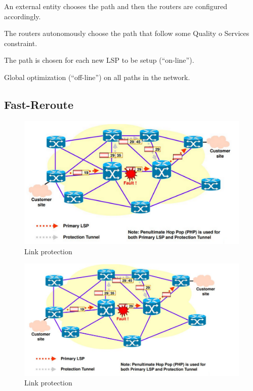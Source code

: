\documentclass[12pt]{article}
\begin{document}
An external entity chooses the path and then the routers are configured accordingly. 

The routers autonomously choose the path that follow some Quality o Services constraint. 

The path is chosen for each new LSP to be setup (“on-line”).

Global optimization (“off-line”) on all paths in the network.

\newpage
\subsection*{Fast-Reroute}

\begin{figure}[ht]
    \includegraphics[scale = 0.4]{Example8.png}
    \caption{Link protection}
    \centering
\end{figure}

\begin{figure}[ht]
    \includegraphics[scale = 0.40]{Example9.png}
    \caption{Link protection}
    \centering
\end{figure}
\end{document}
